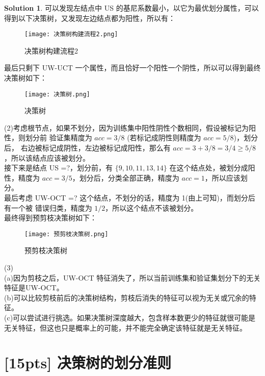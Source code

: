 \documentclass[a4paper]{article}
\numberwithin{equation}{section}
\theoremstyle{definition}
\newtheorem*{solution}{Solution}
\begin{document}
\begin{solution}
可以发现左结点中 US 的基尼系数最小，以它为最优划分属性，可以得到以下决策树，又发现左边结点都为阳性，所以有：
 \begin{figure}[H]
    \centering
    \texttt{[image: 决策树构建流程2.png]}\\
    \caption{决策树构建流程2}
    \label{fig:roc}
\end{figure}
最后只剩下 UW-UCT 一个属性，而且恰好一个阳性一个阴性，所以可以得到最终
决策树如下：
 \begin{figure}[H]
    \centering
    \texttt{[image: 决策树.png]}\\
    \caption{决策树}
    \label{fig:roc}
\end{figure}
(2)考虑根节点，如果不划分，因为训练集中阳性阴性个数相同，假设被标记为阳性，则划分前
验证集精度为 $acc = 3/8$ (若标记成阴性则精度为 $acc = 5/8$)，划分后， 右边被标记成阴性，左边被标记成阳性，那么有 $acc = 3+3/8 = 3/4 \geq  5/8$，所以该结点应该被划分。\\
接下来是结点 US =?，划分前，有 $\lbrace9, 10, 11, 13, 14\rbrace$ 在这个结点处，被划分成阳性，精度为 $acc = 3/5$，划分后，分类全部正确，精度为 $acc = 1$，所以应该划分。\\
最后考虑 UW-OCT =? 这个结点，不划分的话，精度为 1(由上可知)，而划分后有一个被
错误归类，精度为 $1/2$，所以这个结点不该被划分。\\
最终得到预剪枝决策树如下：
 \begin{figure}[H]
    \centering
    \texttt{[image: 预剪枝决策树.png]}\\
    \caption{预剪枝决策树}
    \label{fig:roc}
\end{figure}
(3)\\
(a)因为剪枝之后，UW-OCT 特征消失了，所以当前训练集和验证集划分下的无关特征是UW-OCT。\\
(b)可以比较剪枝前后的决策树结构，剪枝后消失的特征可以视为无关或冗余的特征。\\
(c)可以尝试进行挑选。如果决策树深度越大，包含样本数更少的特征就很可能是无关特征，但这也只是概率上的可能，并不能完全确定该特征就是无关特征。
\end{solution}

\newpage

\section{[15pts] 决策树的划分准则}
\end{document}
